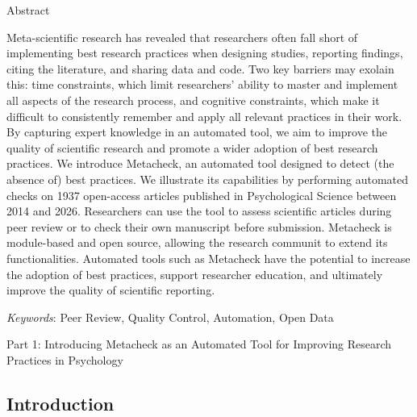\documentclass[
  letterpaper,
  12pt]{article}
\newcommand{\apatitle}[1]{%
  {\centering\bfseries #1\par}}
\newcommand{\apatitlepageheading}[1]{%
  {\centering\bfseries #1\par}}
\newenvironment{apanoindent}
  {\par\setlength{\parindent}{0pt}}
  {\par}
\begin{document}
\clearpage

\apatitlepageheading{

Abstract

}

\begin{apanoindent}

Meta-scientific research has revealed that researchers often fall short
of implementing best research practices when designing studies,
reporting findings, citing the literature, and sharing data and code.
Two key barriers may exolain this: time constraints, which limit
researchers' ability to master and implement all aspects of the research
process, and cognitive constraints, which make it difficult to
consistently remember and apply all relevant practices in their work. By
capturing expert knowledge in an automated tool, we aim to improve the
quality of scientific research and promote a wider adoption of best
research practices. We introduce Metacheck, an automated tool designed
to detect (the absence of) best practices. We illustrate its
capabilities by performing automated checks on 1937 open-access articles
published in Psychological Science between 2014 and 2026. Researchers
can use the tool to assess scientific articles during peer review or to
check their own manuscript before submission. Metacheck is module-based
and open source, allowing the research communit to extend its
functionalities. Automated tools such as Metacheck have the potential to
increase the adoption of best practices, support researcher education,
and ultimately improve the quality of scientific reporting.

\end{apanoindent}

\emph{Keywords}: Peer Review, Quality Control, Automation, Open Data

\clearpage

\apatitle{

Part 1: Introducing Metacheck as an Automated Tool for Improving
Research Practices in Psychology

}

\subsection{Introduction}\label{introduction}
\end{document}
